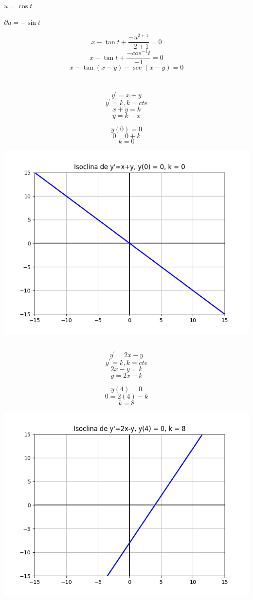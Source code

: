 \documentclass{article}
\begin{document}
    $ u = \cos{t}$

    $ \partial{u} = -\sin{t}$ 
    
    \[ x - \tan{t} + \frac{-u^{2+1}}{-2+1} = 0\]
    \[ x - \tan{t} + \frac{-cos^{-1}{t}}{-1} = 0\]
    \[ x - \tan{(x-y)} - \sec{(x-y)} = 0\]

\section{}
    \subsection{}
    \[ y^{'} = x+y \]
    \[ y^{'} = k , k = cte\]
    \[ x + y = k\]
    \[ y = k - x\]

    \[y(0) = 0\]
    \[ 0 = 0 + k\]
    \[k = 0\]

    \includegraphics{isoclina_y'=x+y.png}

    \subsection{}
    \[y^{'} = 2x-y\]
    \[ y^{'} = k , k = cte\]
    \[ 2x - y = k\]
    \[ y = 2x - k\]

    \[y(4) = 0\]
    \[ 0 = 2(4) - k\]
    \[k = 8\]

    \includegraphics{isoclina_y'=2x-y.png}
    
\end{document}
